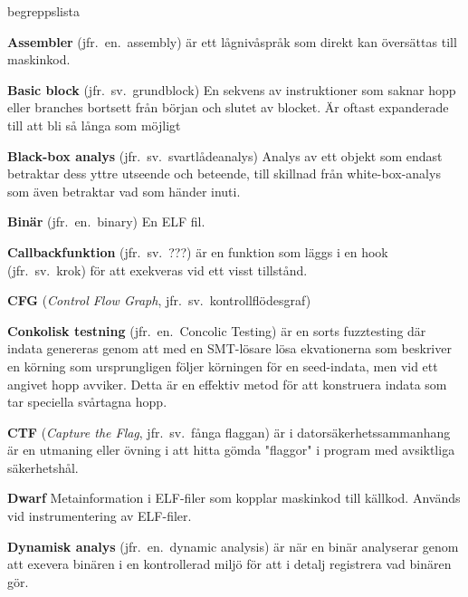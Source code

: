 \begin{labeling}{begreppslista}

    \item [\textbf{Assembler}] (jfr.\ en.\ assembly) är ett
    lågnivåspråk som direkt kan översättas till maskinkod.

    \item[\textbf{Basic block}] (jfr.\ sv.\ grundblock) En sekvens av
    instruktioner som saknar hopp eller branches bortsett från
    början och slutet av blocket. Är oftast expanderade till att
    bli så långa som möjligt

    \item [\textbf{Black-box analys}] (jfr.\ sv.\ svartlådeanalys)
    Analys av ett objekt som endast betraktar dess yttre utseende
    och beteende, till skillnad från white-box-analys som även
    betraktar vad som händer inuti.

    \item [\textbf{Binär}] (jfr.\ en.\ binary) En ELF fil.

    \item [\textbf{Callbackfunktion}] (jfr.\ sv.\ ???) är en funktion
    som läggs i en hook (jfr.\ sv.\ krok) för att exekveras vid
    ett visst tillstånd.

    \item [\textbf{CFG}] (\emph{Control Flow Graph},
          jfr.\ sv.\ kontrollflödesgraf)

    \item [\textbf{Conkolisk testning}] (jfr.\ en.\ Concolic Testing)
    är en sorts fuzztesting där indata genereras genom att med en
    SMT-lösare lösa ekvationerna som beskriver en körning som
    ursprungligen följer körningen för en seed-indata, men vid ett
    angivet hopp avviker. Detta är en effektiv metod för att
    konstruera indata som tar speciella svårtagna hopp.

    \item [\textbf{CTF}] (\emph{Capture the Flag}, jfr.\ sv.\ fånga
          flaggan) är i datorsäkerhetssammanhang är en utmaning eller
    övning i att hitta gömda "flaggor" i program med avsiktliga
    säkerhetshål.

    \item [\textbf{Dwarf}] Metainformation i ELF-filer som kopplar
    maskinkod till källkod. Används vid instrumentering av
    ELF-filer.

    \item [\textbf{Dynamisk analys}] (jfr.\ en.\ dynamic analysis) är
    när en binär analyserar genom att exevera binären i en
    kontrollerad miljö för att i detalj registrera vad binären
    gör.


\end{labeling}
